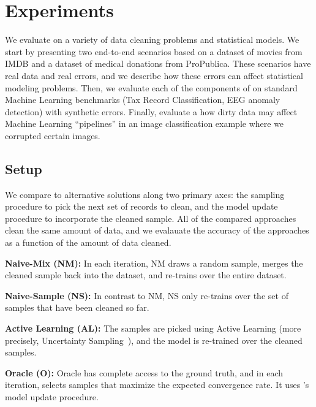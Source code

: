 \section{Experiments}\label{eval}
We evaluate \sys on a variety of data cleaning problems and statistical models.
We start by presenting two end-to-end scenarios based on a dataset of movies from IMDB and a dataset of medical donations from ProPublica.
These scenarios have real data and real errors, and we describe how these errors can affect statistical modeling problems.
Then, we evaluate each of the components of \sys on standard Machine Learning benchmarks (Tax Record Classification, EEG anomaly detection) with synthetic errors.
Finally, evaluate a how dirty data may affect Machine Learning ``pipelines'' in an image classification example where we corrupted certain images.

\subsection{Setup}
We compare \sys to alternative solutions along two primary axes: the sampling procedure to pick the next set of records to clean, and the model update procedure to incorporate the cleaned sample.
All of the compared approaches clean the same amount of data, and we evalauate the accuracy of the approaches as a function of the amount of data cleaned.



\vspace{0.25em}
\noindent\textbf{Naive-Mix (NM): } In each iteration, NM draws a random sample, merges the cleaned sample back into the dataset, and re-trains over the entire dataset.

\vspace{0.25em}
\noindent\textbf{Naive-Sample (NS): } In contrast to NM, NS only re-trains over the set of samples that have been cleaned so far.

\vspace{0.25em}
\noindent\textbf{Active Learning (AL): }
The samples are picked using Active Learning (more precisely, Uncertainty Sampling~\cite{settles2010active}), and the model is re-trained over the cleaned samples.

\vspace{0.25em}
\noindent\textbf{Oracle (O): } Oracle has complete access to the ground truth, and in each iteration, selects samples that maximize the expected convergence rate.  It uses \sys's model update procedure.  

